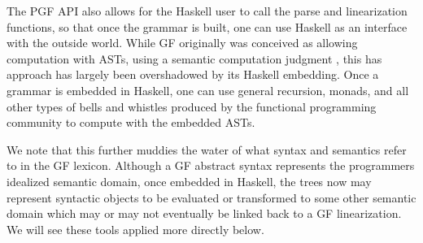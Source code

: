 The PGF API also allows for the Haskell user to call the parse and linearization
functions, so that once the grammar is built, one can use Haskell as an
interface with the outside world. While GF originally was conceived as allowing
computation with ASTs, using a semantic computation judgment , this
has approach has largely been overshadowed by its Haskell embedding. Once a
grammar is embedded in Haskell, one can use general recursion, monads, and all
other types of bells and whistles produced by the functional programming
community to compute with the embedded ASTs.

We note that this further muddies the water of what syntax and semantics refer
to in the GF lexicon. Although a GF abstract syntax represents the
programmers idealized semantic domain, once embedded in Haskell, the trees now may
represent syntactic objects to be evaluated or transformed to some other
semantic domain which may or may not eventually be linked back to a GF
linearization. We will see these tools applied more directly below.





